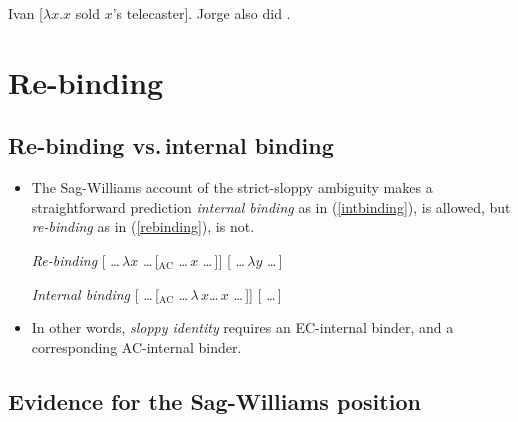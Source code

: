 \documentclass[nofonts,nobib]{tufte-handout}
\begin{document}
\begin{itemize}
    \ex   
    Ivan [\( λ x .  x \) sold \(x\)'s telecaster].\newline
    Jorge also did .
    \xe
    
    
\end{itemize}

\section{Re-binding}

\subsection{Re-binding vs.\,internal binding}

\begin{itemize}

  \item The Sag-Williams account of the strict-sloppy ambiguity makes a straightforward prediction \emph{internal binding} as in (\ref{intbinding}), is allowed, but \emph{re-binding} as in (\ref{rebinding}), is not. 
    
    \begin{multicols}{2}

    \pex\label{rebinding}\emph{Re-binding} \xmark
    \a\label{rebindingA}[ \ldots\,\(λ x\) \ldots\,[\(_{\text{AC}}\) \ldots\,\(x\) \ldots\,]]
    \a\label{rebindingE}[ \ldots\,\(λ y\) \ldots\,]
    \xe
    
    \columnbreak
    
    \pex\label{intbinding}\emph{Internal binding} \cmark
    \a\label{intbindingA}[ \ldots\,[\(_{\text{AC}}\) \ldots\,\(λ\,x\)\ldots\,\(x\) \ldots\,]]
    \a\label{intbindingE}[ \ldots\,]
    \xe
    
    \end{multicols}
    
  \item In other words, \emph{sloppy identity} requires an EC-internal binder, and a corresponding AC-internal binder.

\end{itemize}

\subsection{Evidence for the Sag-Williams position}
\end{document}
